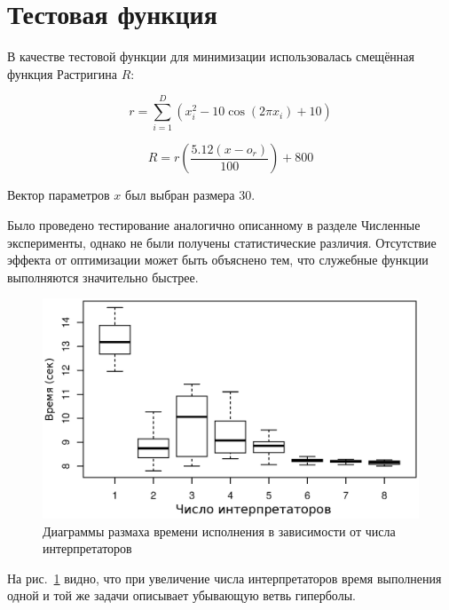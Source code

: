 \section*{Тестовая функция}

В качестве тестовой функции для минимизации
использовалась смещённая функция Растригина $R$:

\begin{equation*}
    r = \sum_{i = 1}^{D}(x_i^2 - 10\cos(2 \pi x_i) + 10)
\end{equation*}

\begin{equation*}
    R = r\left(\frac{5.12 (x - o_r)}{100}\right) + 800
\end{equation*}

Вектор параметров $x$ был выбран размера 30.

Было проведено тестирование
аналогично описанному в разделе
Численные эксперименты,
однако не были получены
статистические различия.
Отсутствие эффекта
от оптимизации может
быть объяснено тем,
что служебные функции
выполняются значительно быстрее.

\begin{figure}[h]
\includegraphics{rastrigin}
\caption{Диаграммы размаха времени исполнения
в зависимости от числа интерпретаторов}
\label{fig:rastriginboxplot}
\end{figure}

На рис.~\ref{fig:rastriginboxplot} видно,
что при увеличение числа интерпретаторов
время выполнения одной и той же задачи
описывает убывающую ветвь гиперболы.

